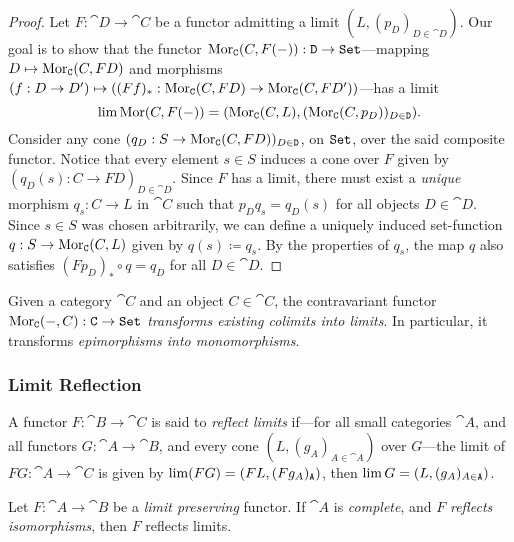 \begin{proof}
    Let \(F: \cat D \to \cat C\) be a functor admitting a limit
    \((L, (p_D)_{D \in \cat D})\). Our goal is to show that the functor
    \(\operatorname{Mor}_{\texttt C}(C, F(-)): \texttt D \to {\texttt{Set}}\)---mapping
    \(D \mapsto \operatorname{Mor}_{\texttt C}(C, F D)\) and morphisms
    \((f: D \to D') \mapsto ((F f)_{*}: \operatorname{Mor}_{\texttt C}(C, F D) \to \operatorname{Mor}_{\texttt C}(C, F
    D'))\)---has a limit
    \[
        \operatorname{lim} \operatorname{Mor}(C, F(-))
        = (\operatorname{Mor}_{\texttt C}(C, L), (\operatorname{Mor}_{\texttt C}(C, p_D))_{D \in \texttt D}).
    \]
    Consider any cone \((q_D: S \to \operatorname{Mor}_{\texttt C}(C, F D))_{D \in \texttt D}\), on
    \({\texttt{Set}}\), over the said composite functor. Notice that every element \(s \in S\)
    induces a cone over \(F\) given by \((q_D(s): C \to F D)_{D \in \cat D}\). Since
    \(F\) has a limit, there must exist a \emph{unique} morphism \(q_s: C \to L\) in
    \(\cat C\) such that \(p_D q_s = q_D(s)\) for all objects \(D \in \cat
    D\). Since \(s \in S\) was chosen arbitrarily, we can define a uniquely induced
    set-function \(q: S \to \operatorname{Mor}_{\texttt C}(C, L)\) given by \(q(s) \coloneq q_s\).
    By the properties of \(q_s\), the map \(q\) also satisfies
    \((F p_D)_{*} \circ q = q_D\) for all \(D \in \cat D\).
\end{proof}

\begin{corollary}
    \label{cor:contrav-Mor-colim-into-lim}
    Given a category \(\cat C\) and an object \(C \in \cat C\), the contravariant
    functor \(\operatorname{Mor}_{\texttt C}(-, C): \texttt C \to {\texttt{Set}}\) \emph{transforms existing
        colimits into limits}. In particular, it transforms \emph{epimorphisms into
        monomorphisms}.
\end{corollary}

\subsubsection{Limit Reflection}

\begin{definition}
    \label{def:functor-reflect-limit}
    A functor \(F: \cat B \to \cat C\) is said to \emph{reflect limits} if---for all
    small categories \(\cat A\), and all functors \(G: \cat A \to \cat B\), and
    every cone \((L, (g_A)_{A \in \cat A})\) over \(G\)---the limit of \(F G: \cat
    A \to \cat C\) is given by \(\operatorname{lim}(F G) = (F L, (F g_A)_{\texttt A})\), then \(\operatorname{lim}
    G = (L, (g_A)_{A \in \texttt A})\).
\end{definition}

\begin{proposition}
    \label{prop:complete-reflect-iso-reflect-limits}
    Let \(F: \cat A \to \cat B\) be a \emph{limit preserving} functor. If \(\cat A\)
    is \emph{complete}, and \(F\) \emph{reflects isomorphisms}, then \(F\) reflects
    limits.
\end{proposition}

